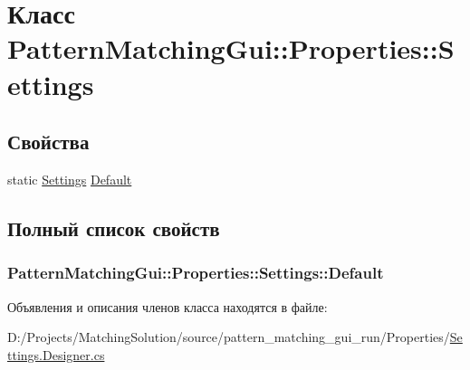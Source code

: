 \hypertarget{class_pattern_matching_gui_1_1_properties_1_1_settings}{
\section{Класс PatternMatchingGui::Properties::Settings}
\label{class_pattern_matching_gui_1_1_properties_1_1_settings}
}
\subsection*{Свойства}
\begin{CompactItemize}
\item 
static \hyperlink{class_pattern_matching_gui_1_1_properties_1_1_settings}{Settings} \hyperlink{class_pattern_matching_gui_1_1_properties_1_1_settings_0479512b2d439190014bc6423cf711b5}{Default}
\end{CompactItemize}


\subsection{Полный список свойств}
\hypertarget{class_pattern_matching_gui_1_1_properties_1_1_settings_0479512b2d439190014bc6423cf711b5}{
\subsubsection[{Default}]{ PatternMatchingGui::Properties::Settings::Default}}
\label{class_pattern_matching_gui_1_1_properties_1_1_settings_0479512b2d439190014bc6423cf711b5}




Объявления и описания членов класса находятся в файле:\begin{CompactItemize}
\item 
D:/Projects/MatchingSolution/source/pattern\_\-matching\_\-gui\_\-run/Properties/\hyperlink{_settings_8_designer_8cs}{Settings.Designer.cs}\end{CompactItemize}
